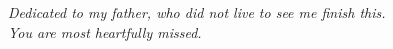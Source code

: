 \null
\vfill
\noindent
\begin{minipage}{\textwidth}%
\raggedleft%
\emph{Dedicated to my father, who did not live to see me finish this.\\You are most heartfully missed.}
\end{minipage}%
\vfill

\cleardoublepage